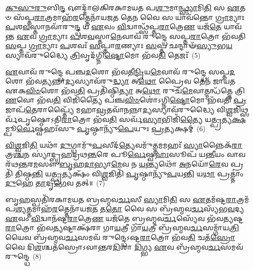 {\anuvakamend[{\-\ul{𑌪𑍃}\-𑌷𑍍𑌠𑌾𑌨𑌿᳴ 𑌸𑌪𑍍𑌤\-\ul{𑌦}\-𑌶𑌃 𑌸𑍁᳴\-\ul{𑌵}\-𑌰𑍍𑌗𑍋 𑌜᳴𑌯𑌨𑍍𑌤𑌿 \ul{𑌯}\-𑌦𑍈𑌕𑌾᳴\-𑌦𑌶 𑌚}]}%

\-\ul{𑌕𑍁}\-\-\ul{𑌸𑍁}\-\-\ul{𑌰𑍁}\-𑌬𑌿\-\ul{𑌨𑍍𑌦} 𑌔𑌦𑍍𑌦𑌾᳴𑌲𑌕𑌿𑌰𑌕𑌾𑌮𑌯𑌤 𑌪\-\ul{𑌶𑍁}\-𑌮𑌾\-\ul{𑌨𑍍𑌥𑍍𑌸𑍍𑌯𑌾}\-𑌮𑌿\-\ul{𑌤𑌿} 𑌸 \ul{𑌏}\-𑌤𑍞 𑌸᳴𑌪𑍍𑌤\-\ul{𑌰𑌾}\-𑌤𑍍𑌰𑌮𑌾𑌹᳴\-\ul{𑌰}\-𑌤𑍍𑌤𑍇𑌨𑌾᳴𑌯𑌜\-\ul{𑌤} 𑌤𑍇\-\ul{𑌨} 𑌵𑍈 𑌸 𑌯𑌾𑌵᳴𑌨𑍍𑌤𑍋 \ul{𑌗𑍍𑌰𑌾}\-𑌮𑍍𑌯𑌾𑌃 \ul{𑌪}\-𑌶\-\ul{𑌵}\-𑌸𑍍𑌤𑌾𑌨𑌵𑌾᳴𑌰𑍁\-\ul{𑌨𑍍𑌦𑍍𑌧} 𑌯 \ul{𑌏}\-𑌵𑌂 \ul{𑌵𑌿}\-𑌦𑍍𑌵𑌾𑌨𑍍𑌥𑍍𑌸᳴𑌪𑍍𑌤\-\ul{𑌰𑌾}\-𑌤𑍍𑌰𑍇\-\ul{𑌣} 𑌯𑌜᳴\-\ul{𑌤𑍇} 𑌯𑌾𑌵᳴𑌨𑍍𑌤 \ul{𑌏}\-𑌵 \ul{𑌗𑍍𑌰𑌾}\-𑌮𑍍𑌯𑌾𑌃 \ul{𑌪}\-𑌶\-\ul{𑌵}\-𑌸𑍍𑌤𑌾\-\ul{𑌨𑍇}\-𑌵𑌾𑌵᳴ 𑌰𑍁𑌨𑍍𑌦𑍍𑌧𑍇 𑌸𑌪𑍍𑌤\-\ul{𑌰𑌾}\-𑌤𑍍𑌰𑍋 𑌭᳴𑌵𑌤𑌿 \ul{𑌸}\-𑌪𑍍𑌤 \ul{𑌗𑍍𑌰𑌾}\-𑌮𑍍𑌯𑌾𑌃 \ul{𑌪}\-𑌶𑌵𑌃᳴ \ul{𑌸}\-𑌪𑍍𑌤𑌾\-\ul{𑌰}\-𑌣𑍍𑌯𑌾𑌃 \ul{𑌸}\-𑌪𑍍𑌤 𑌛𑌨𑍍𑌦𑌾𑍟᳴\-\ul{𑌸𑍍𑌯𑍁}\-𑌭\-\ul{𑌯}\-𑌸𑍍𑌯𑌾𑌵᳴𑌰𑍁𑌦𑍍𑌧𑍍𑌯𑍈 \ul{𑌤𑍍𑌰𑌿}\-𑌵𑍃𑌦᳴𑌗𑍍𑌨𑌿\-\ul{𑌷𑍍𑌟𑍋}\-𑌮𑍋 𑌭᳴𑌵\-\ul{𑌤𑌿} 𑌤𑍇𑌜𑌃᳴~(5)

\-\ul{𑌏}\-𑌵𑌾𑌵᳴ 𑌰𑍁𑌨𑍍𑌦𑍍𑌧𑍇 𑌪𑌞𑍍𑌚\-\ul{𑌦}\-𑌶𑍋 𑌭᳴𑌵𑌤𑍀\-\ul{𑌨𑍍𑌦𑍍𑌰𑌿}\-𑌯\-\ul{𑌮𑍇}\-𑌵𑌾𑌵᳴ 𑌰𑍁𑌨𑍍𑌦𑍍𑌧𑍇 𑌸𑌪𑍍𑌤\-\ul{𑌦}\-𑌶𑍋 𑌭᳴𑌵\-\ul{𑌤𑍍𑌯}\-𑌨𑍍𑌨𑌾\-\ul{𑌦𑍍𑌯}\-𑌸𑍍𑌯𑌾𑌵᳴𑌰𑍁\-\ul{𑌦𑍍𑌧𑍍𑌯𑌾} 𑌅\-\ul{𑌥𑍋} 𑌪𑍍𑌰𑍈𑌵 𑌤𑍇𑌨᳴ 𑌜𑌾𑌯𑌤 𑌏𑌕\-\ul{𑌵𑌿}\-\-\ul{𑍞}\-𑌶𑍋 𑌭᳴𑌵\-\ul{𑌤𑌿} 𑌪𑍍𑌰𑌤𑌿᳴𑌷𑍍𑌠𑌿\-\ul{𑌤𑍍𑌯𑌾} 𑌅\-\ul{𑌥𑍋} 𑌰𑍁𑌚᳴\-\ul{𑌮𑍇}\-𑌵𑌾𑌤𑍍𑌮𑌨𑍍𑌧᳴𑌤𑍍𑌤𑍇 𑌤𑍍𑌰𑌿\-\ul{𑌣}\-𑌵𑍋 𑌭᳴𑌵\-\ul{𑌤𑌿} 𑌵𑌿𑌜𑌿᳴𑌤𑍍𑌯𑍈 𑌪𑌞𑍍𑌚\-\ul{𑌵𑌿}\-\-\ul{𑍞}\-𑌶𑍋॑\-𑌽𑌗𑍍𑌨𑌿\-\ul{𑌷𑍍𑌟𑍋}\-𑌮𑍋 𑌭᳴𑌵𑌤𑌿 \ul{𑌪𑍍𑌰}\-𑌜𑌾𑌪᳴\-\ul{𑌤𑍇}\-𑌰𑌾𑌪𑍍𑌤𑍍𑌯𑍈᳴ 𑌮𑌹𑌾\-\ul{𑌵𑍍𑌰}\-𑌤𑌵𑌾᳴\-\ul{𑌨}\-𑌨𑍍𑌨𑌾\-\ul{𑌦𑍍𑌯}\-𑌸𑍍𑌯𑌾𑌵᳴𑌰𑍁𑌦𑍍𑌧𑍍𑌯𑍈 𑌵𑌿\-\ul{𑌶𑍍𑌵}\-𑌜𑌿𑌥𑍍𑌸𑌰𑍍𑌵᳴𑌪𑍃𑌷𑍍𑌠𑍋\-𑌽𑌤𑌿\-\ul{𑌰𑌾}\-𑌤𑍍𑌰𑍋 𑌭᳴𑌵\-\ul{𑌤𑌿} 𑌸𑌰𑍍𑌵᳴\-\ul{𑌸𑍍𑌯𑌾}\-𑌭𑌿𑌜𑌿᳴\-\ul{𑌤𑍍𑌯𑍈} 𑌯\-\ul{𑌤𑍍𑌪𑍍𑌰}\-𑌤𑍍𑌯\-\ul{𑌕𑍍𑌷}\-𑌮𑍍𑌪𑍂\-\ul{𑌰𑍍𑌵𑍇}\-𑌷𑍍𑌵𑌹𑌃᳴𑌸𑍁 \ul{𑌪𑍃}\-𑌷𑍍𑌠𑌾𑌨𑍍𑌯𑍁᳴\-\ul{𑌪𑍇}\-𑌯𑍁𑌃 \ul{𑌪𑍍𑌰}\-𑌤𑍍𑌯𑌕𑍍𑌷𑌮𑍍॑~(6)

\-\ul{𑌵𑌿}\-\-\ul{𑌶𑍍𑌵}\-𑌜𑌿\-\ul{𑌤𑌿} 𑌯𑌥𑌾᳴ \ul{𑌦𑍁}\-𑌗𑍍𑌧𑌾𑌮𑍁᳴\-\ul{𑌪}\-𑌸𑍀𑌦᳴\-\ul{𑌤𑍍𑌯𑍇}\-𑌵𑌮𑍁᳴\-\ul{𑌤𑍍𑌤}\-𑌮𑌮𑌹𑌃᳴ \ul{𑌸𑍍𑌯𑌾}\-𑌨𑍍𑌨𑍈𑌕᳴\-\ul{𑌰𑌾}\-𑌤𑍍𑌰\-\ul{𑌶𑍍𑌚}\-𑌨 𑌸𑍍𑌯𑌾॑𑌦𑍍𑌬𑍃𑌹𑌦𑍍𑌰𑌥\-\ul{𑌨𑍍𑌤}\-𑌰𑍇 𑌪𑍂\-\ul{𑌰𑍍𑌵𑍇}\-𑌷𑍍𑌵\-\ul{𑌹𑌃}\-𑌸𑍂𑌪᳴ 𑌯\-\ul{𑌨𑍍𑌤𑍀}\-𑌯𑌂 𑌵𑌾𑌵 𑌰᳴𑌥\-\ul{𑌨𑍍𑌤}\-𑌰\-\ul{𑌮}\-𑌸𑍗 \ul{𑌬𑍃}\-𑌹\-\ul{𑌦𑌾}\-𑌭𑍍𑌯𑌾\-\ul{𑌮𑍇}\-𑌵 𑌨 \ul{𑌯}\-𑌨𑍍𑌤𑍍𑌯𑌥𑍋᳴ \ul{𑌅}\-𑌨𑌯𑍋᳴\-\ul{𑌰𑍇}\-𑌵 𑌪𑍍𑌰𑌤𑌿᳴ 𑌤𑌿𑌷𑍍𑌠\-\ul{𑌨𑍍𑌤𑌿} 𑌯\-\ul{𑌤𑍍𑌪𑍍𑌰}\-𑌤𑍍𑌯𑌕𑍍𑌷𑌂᳴ 𑌵𑌿\-\ul{𑌶𑍍𑌵}\-𑌜𑌿𑌤𑌿᳴ \ul{𑌪𑍃}\-𑌷𑍍𑌠𑌾𑌨𑍍𑌯𑍁᳴\-\ul{𑌪}\-𑌯\-\ul{𑌨𑍍𑌤𑌿} 𑌯\-\ul{𑌥𑌾} 𑌪𑍍𑌰𑌤𑍍𑌤𑌾𑌂॑ \ul{𑌦𑍁}\-𑌹𑍇 \ul{𑌤𑌾}\-𑌦𑍃\-\ul{𑌗𑍇}\-𑌵 𑌤𑌤𑍍॥~(7)

{\anuvakamend[{𑌤𑍇𑌜᳴ 𑌉\-\ul{𑌪𑍇}\-𑌯𑍁𑌃 \ul{𑌪𑍍𑌰}\-𑌤𑍍𑌯\-\ul{𑌕𑍍𑌷𑌂} 𑌦𑍍𑌵𑌿𑌚᳴𑌤𑍍𑌵𑌾𑌰𑌿𑍞𑌶𑌚𑍍𑌚}]}%

𑌬𑍃\-\ul{𑌹}\-𑌸𑍍𑌪𑌤𑌿᳴𑌰𑌕𑌾𑌮𑌯𑌤 𑌬𑍍𑌰𑌹𑍍𑌮𑌵\-\ul{𑌰𑍍𑌚}\-𑌸𑍀 \ul{𑌸𑍍𑌯𑌾}\-𑌮𑌿\-\ul{𑌤𑌿} 𑌸 \ul{𑌏}\-𑌤𑌮᳴𑌷𑍍𑌟\-\ul{𑌰𑌾}\-𑌤𑍍𑌰𑌮᳴𑌪\-\ul{𑌶𑍍𑌯}\-𑌤𑍍𑌤𑌮𑌾𑌹᳴\-\ul{𑌰}\-𑌤𑍍𑌤𑍇𑌨𑌾᳴𑌯𑌜\-\ul{𑌤} 𑌤\-\ul{𑌤𑍋} 𑌵𑍈 𑌸 𑌬𑍍𑌰᳴𑌹𑍍𑌮𑌵\-\ul{𑌰𑍍𑌚}\-𑌸𑍍𑌯᳴𑌭\-\ul{𑌵}\-𑌦𑍍𑌯 \ul{𑌏}\-𑌵𑌂 \ul{𑌵𑌿}\-𑌦𑍍𑌵𑌾𑌨᳴𑌷𑍍𑌟\-\ul{𑌰𑌾}\-𑌤𑍍𑌰𑍇\-\ul{𑌣} 𑌯𑌜᳴𑌤𑍇 𑌬𑍍𑌰𑌹𑍍𑌮𑌵\-\ul{𑌰𑍍𑌚}\-𑌸𑍍𑌯𑍇᳴𑌵 𑌭᳴𑌵𑌤𑍍𑌯𑌷𑍍𑌟\-\ul{𑌰𑌾}\-𑌤𑍍𑌰𑍋 𑌭᳴𑌵\-\ul{𑌤𑍍𑌯}\-𑌷𑍍𑌟𑌾𑌕𑍍𑌷᳴𑌰𑌾 𑌗𑌾\-\ul{𑌯}\-𑌤𑍍𑌰𑍀 𑌗𑌾᳴\-\ul{𑌯}\-𑌤𑍍𑌰𑍀 𑌬𑍍𑌰᳴𑌹𑍍𑌮𑌵\-\ul{𑌰𑍍𑌚}\-𑌸𑌮𑍍𑌗𑌾᳴𑌯\-\ul{𑌤𑍍𑌰𑌿}\-𑌯𑍈𑌵 𑌬𑍍𑌰᳴𑌹𑍍𑌮𑌵\-\ul{𑌰𑍍𑌚}\-𑌸𑌮𑌵᳴ 𑌰𑍁𑌨𑍍𑌦𑍍𑌧𑍇\-𑌽𑌷𑍍𑌟\-\ul{𑌰𑌾}\-𑌤𑍍𑌰𑍋 𑌭᳴𑌵\-\ul{𑌤𑌿} 𑌚𑌤᳴\-\ul{𑌸𑍍𑌰𑍋} 𑌵𑍈 𑌦𑌿\-\ul{𑌶}\-𑌶𑍍𑌚𑌤᳴𑌸𑍍𑌰𑍋\-𑌽𑌵𑌾𑌨𑍍𑌤𑌰\-\ul{𑌦𑌿}\-𑌶𑌾 \ul{𑌦𑌿}\-𑌗𑍍𑌭𑍍𑌯 \ul{𑌏}\-𑌵 𑌬𑍍𑌰᳴𑌹𑍍𑌮𑌵\-\ul{𑌰𑍍𑌚}\-𑌸𑌮𑌵᳴ 𑌰𑍁𑌨𑍍𑌦𑍍𑌧𑍇~(8)

